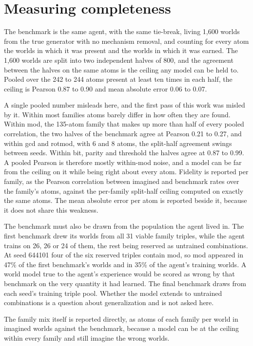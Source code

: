 \documentclass[11pt]{article}
\begin{document}
\section{Measuring completeness}

The benchmark is the same agent, with the same tie-break, living 1,600 worlds from the true generator with no mechanism removal, and counting for every atom the worlds in which it was present and the worlds in which it was earned. The 1,600 worlds are split into two independent halves of 800, and the agreement between the halves on the same atoms is the ceiling any model can be held to. Pooled over the 242 to 244 atoms present at least ten times in each half, the ceiling is Pearson 0.87 to 0.90 and mean absolute error 0.06 to 0.07.

A single pooled number misleads here, and the first pass of this work was misled by it. Within most families atoms barely differ in how often they are found. Within mod, the 135-atom family that makes up more than half of every pooled correlation, the two halves of the benchmark agree at Pearson 0.21 to 0.27, and within gcd and rotmod, with 6 and 8 atoms, the split-half agreement swings between seeds. Within bit, parity and threshold the halves agree at 0.87 to 0.99. A pooled Pearson is therefore mostly within-mod noise, and a model can be far from the ceiling on it while being right about every atom. Fidelity is reported per family, as the Pearson correlation between imagined and benchmark rates over the family's atoms, against the per-family split-half ceiling computed on exactly the same atoms. The mean absolute error per atom is reported beside it, because it does not share this weakness.

The benchmark must also be drawn from the population the agent lived in. The first benchmark drew its worlds from all 31 viable family triples, while the agent trains on 26, 26 or 24 of them, the rest being reserved as untrained combinations. At seed 644101 four of the six reserved triples contain mod, so mod appeared in 47\% of the first benchmark's worlds and in 35\% of the agent's training worlds. A world model true to the agent's experience would be scored as wrong by that benchmark on the very quantity it had learned. The final benchmark draws from each seed's training triple pool. Whether the model extends to untrained combinations is a question about generalization and is not asked here.

The family mix itself is reported directly, as atoms of each family per world in imagined worlds against the benchmark, because a model can be at the ceiling within every family and still imagine the wrong worlds.
\end{document}
